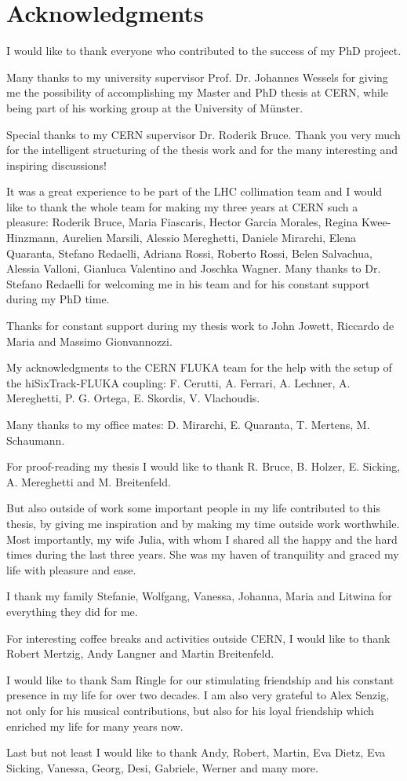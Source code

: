 \section*{Acknowledgments}


I would like to thank everyone who contributed to the success of my PhD project. 

Many thanks to my university supervisor Prof. Dr. Johannes Wessels for giving me the possibility of accomplishing my Master and PhD thesis at CERN, while being part of his working group at the University of M\"{u}nster. 

Special thanks to my CERN supervisor Dr. Roderik Bruce. Thank you very much for the intelligent structuring of the thesis work and for the many interesting and inspiring discussions!

It was a great experience to be part of the LHC collimation team and I would like to thank the whole team for making my three years at CERN such a pleasure: Roderik Bruce, Maria Fiascaris, Hector Garcia Morales, Regina Kwee-Hinzmann, Aurelien Marsili, Alessio Mereghetti, Daniele Mirarchi, Elena Quaranta, Stefano Redaelli, Adriana Rossi, Roberto Rossi, Belen Salvachua, Alessia Valloni, Gianluca Valentino and Joschka Wagner. Many thanks to Dr. Stefano Redaelli for welcoming me in his team and for his constant support during my PhD time. 

Thanks for constant support during my thesis work to John Jowett, Riccardo de Maria and Massimo Gionvannozzi.

My acknowledgments to the CERN FLUKA team for the help with the setup of the hiSixTrack-FLUKA coupling: F. Cerutti, A. Ferrari, A. Lechner, A. Mereghetti, P. G. Ortega, E. Skordis, V. Vlachoudis. 

Many thanks to my office mates: D. Mirarchi, E. Quaranta, T. Mertens, M. Schaumann. 

For proof-reading my thesis I would like to thank R. Bruce, B. Holzer, E. Sicking, A. Mereghetti and M. Breitenfeld.


But also outside of work some important people in my life contributed to this thesis, by giving me inspiration and by making my time outside work worthwhile. Most importantly, my wife Julia, with whom I shared all the happy and the hard times during the last three years. She was my haven of tranquility and graced my life with pleasure and ease. 

I thank my family Stefanie, Wolfgang, Vanessa, Johanna, Maria and Litwina for everything they did for me.

For interesting coffee breaks and activities outside CERN, I would like to thank Robert Mertzig, Andy Langner and Martin Breitenfeld.

I would like to thank Sam Ringle for our stimulating friendship and his constant presence in my life for over two decades. I am also very grateful to Alex Senzig, not only for his musical contributions, but also for his loyal friendship which enriched my life for many years now. 

Last but not least I would like to thank Andy, Robert, Martin, Eva Dietz, Eva Sicking, Vanessa, Georg, Desi, Gabriele, Werner and many more.